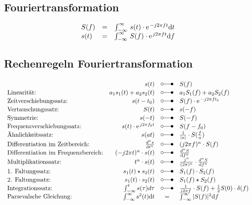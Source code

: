 \subsection{Fouriertransformation}
\begin{align*}
\begin{array}{lrcl}
	S(f) & = & \int_{-\infty}^{\infty} \, s(t) \cdot \e^{-j 2 \pi ft} \mathrm{d}t\\ 
	s(t) & = & \int_{-\infty}^{\infty} \, S(f) \cdot \e^{j 2 \pi ft} \mathrm{d}f\\ 
\end{array}
\end{align*}

\subsection{Rechenregeln Fouriertransformation}

\begin{align*}
\begin{array}{lrcl}
	\mbox{} & s(t) & \laplace & S(f)\\
\mbox{Linearität:} & a_1 s_1(t) + a_2 s_2(t) & \laplace & a_1 S_1(f) + a_2 S_2(f) \\
\mbox{Zeitverschiebungssatz:} & s(t-t_0) & \laplace & S(f) \cdot \e^{-j 2 \pi f t_0}\\
\mbox{Vertauschungssatz:} & S(t) & \laplace & s(-f) \\
\mbox{Symmetrie:} & s(-t) & \laplace & S(-f) \\
\mbox{Frequenzverschiebungssatz:} & s(t) \cdot \e^{j 2 \pi f_0 t}  & \laplace & S(f-f_0) \\
\mbox{Ähnlichkeitssatz:} & s(at) & \laplace & \frac{1}{|a|} \cdot S(\frac{f}{a})\\
\mbox{Differentiation im Zeitbereich:} & \frac{d^n s}{\mathrm{d}t^n} & \laplace & (j 2 \pi f)^n \cdot S(f)\\
\mbox{Differentiation im Frequenzbereich:} & (-j 2 \pi t)^n \cdot s(t) & \laplace & \frac{d^n S}{\mathrm{d}f^n}\\
\mbox{Multiplikationssatz:} & t^n \cdot s(t) & \laplace & \frac{j^n}{(2 \pi)^n} \cdot \frac{d^n S}{\mathrm{d}f^n}\\
\mbox{1. Faltungssatz:} & s_1(t) \star s_2(t) & \laplace & S_1(f) \cdot S_2(f)\\
\mbox{2. Faltungssatz:} & s_1(t) \cdot s_2(t) & \laplace & S_1(f) \star S_2(f)\\
\mbox{Integrationssatz:} & \int_{-\infty}^t s(\tau) d \tau & \laplace & \frac{1}{j 2 \pi f} \cdot S(f) + \frac{1}{2} S(0) \cdot \delta(f)\\
\mbox{Parsevalsche Gleichung:} & \int_{-\infty}^{\infty} s^2(t) \mathrm{d}t & = & \int_{-\infty}^{\infty} |S(f)|^2 \mathrm{d}f\\
\end{array}
\end{align*}

